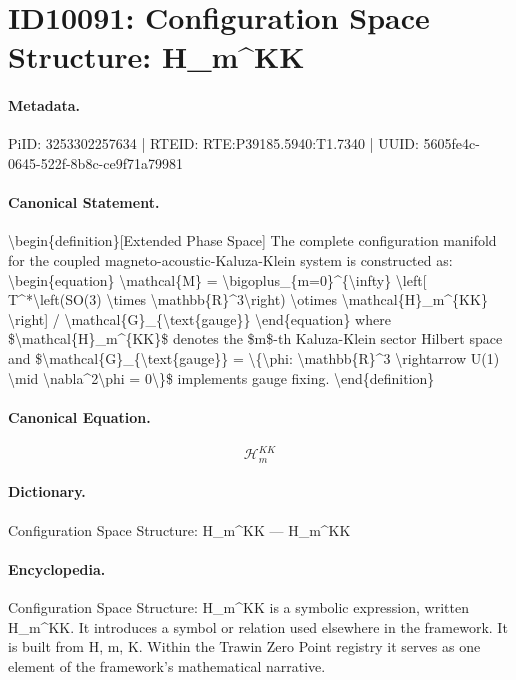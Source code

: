 \section*{ID10091: Configuration Space Structure: H\_m\textasciicircum{}KK}
\paragraph{Metadata.}
PiID: 3253302257634 | RTEID: RTE:P39185.5940:T1.7340 | UUID: 5605fe4c-0645-522f-8b8c-ce9f71a79981

\paragraph{Canonical Statement.}
\textbackslash{}begin\{definition\}[Extended Phase Space] The complete configuration manifold for the coupled magneto-acoustic-Kaluza-Klein system is constructed as: \textbackslash{}begin\{equation\} \textbackslash{}mathcal\{M\} = \textbackslash{}bigoplus\_\{m=0\}\textasciicircum{}\{\textbackslash{}infty\} \textbackslash{}left[ T\textasciicircum{}*\textbackslash{}left(SO(3) \textbackslash{}times \textbackslash{}mathbb\{R\}\textasciicircum{}3\textbackslash{}right) \textbackslash{}otimes \textbackslash{}mathcal\{H\}\_m\textasciicircum{}\{KK\} \textbackslash{}right] / \textbackslash{}mathcal\{G\}\_\{\textbackslash{}text\{gauge\}\} \textbackslash{}end\{equation\} where \$\textbackslash{}mathcal\{H\}\_m\textasciicircum{}\{KK\}\$ denotes the \$m\$-th Kaluza-Klein sector Hilbert space and \$\textbackslash{}mathcal\{G\}\_\{\textbackslash{}text\{gauge\}\} = \textbackslash{}\{\textbackslash{}phi: \textbackslash{}mathbb\{R\}\textasciicircum{}3 \textbackslash{}rightarrow U(1) \textbackslash{}mid \textbackslash{}nabla\textasciicircum{}2\textbackslash{}phi = 0\textbackslash{}\}\$ implements gauge fixing. \textbackslash{}end\{definition\}

\paragraph{Canonical Equation.}
\[
\mathcal{H}_m^{KK}
\]

\paragraph{Dictionary.}
Configuration Space Structure: H\_m\textasciicircum{}KK — H\_m\textasciicircum{}KK

\paragraph{Encyclopedia.}
Configuration Space Structure: H\_m\textasciicircum{}KK is a symbolic expression, written H\_m\textasciicircum{}KK. It introduces a symbol or relation used elsewhere in the framework. It is built from H, m, K. Within the Trawin Zero Point registry it serves as one element of the framework's mathematical narrative.
